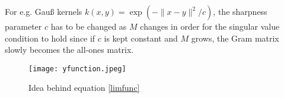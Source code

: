 For e.g. Gauß kernels $k(x,y) = \exp (- \| x - y \|^2 / c)$, the sharpness parameter $c$ 
has to be changed as $M$ changes in order for the singular value condition to hold since 
if $c$ is kept constant and $M$ grows, the Gram matrix slowly becomes the all-ones matrix. 

\begin{figure}
    \centering 
    \texttt{[image: yfunction.jpeg]}
    \caption{
        Idea behind equation \ref{limfunc}
    }
\end{figure}

